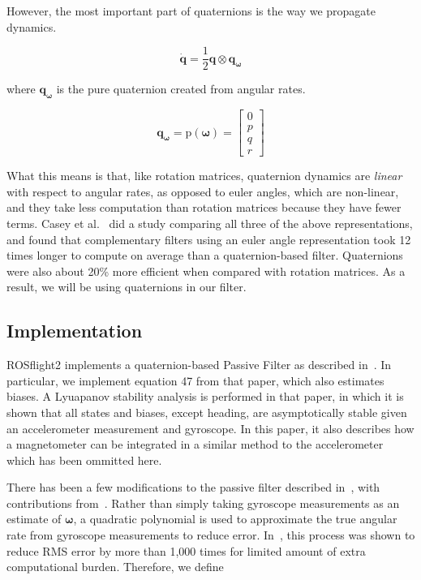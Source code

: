 \documentclass[paper=a4, fontsize=11pt]{scrartcl} %
\numberwithin{equation}{section} %
\numberwithin{figure}{section} %
\numberwithin{table}{section} %
\begin{document}
However, the most important part of quaternions is the way we propagate dynamics.

\begin{equation}
	\dot{\bm{q}} = \frac{1}{2} \bm{q} \otimes \bm{q_{\omega}}
\end{equation}

where $\bm{q_{\omega}}$ is the pure quaternion created from angular rates.

\begin{equation}
	\bm{q_{\omega}} = \textrm{p}(\bm{\omega}) =
			  \begin{bmatrix}
				0 \\
				p \\
				q \\
				r 
			 \end{bmatrix} 
\end{equation}

What this means is that, like rotation matrices, quaternion dynamics are \textit{linear} with respect to angular rates, as opposed to euler angles, which are non-linear, and they take less computation than rotation matrices because they have fewer terms.  Casey et al.~\cite{Casey2013} did a study comparing all three of the above representations, and found that complementary filters using an euler angle representation took 12 times longer to compute on average than a quaternion-based filter.  Quaternions were also about 20\% more efficient when compared with rotation matrices.  As a result, we will be using quaternions in our filter.

\subsection{Implementation}

ROSflight2 implements a quaternion-based Passive Filter as described in~\cite{Mahony2007}.  In particular, we implement equation 47 from that paper, which also estimates biases.  A Lyuapanov stability analysis is performed in that paper, in which it is shown that all states and biases, except heading, are asymptotically stable given an accelerometer measurement and gyroscope.  In this paper, it also describes how a magnetometer can be integrated in a similar method to the accelerometer which has been ommitted here.

There has been a few modifications to the passive filter described in~\cite{Mahony2007}, with contributions from~\cite{Casey2013}.  Rather than simply taking gyroscope measurements as an estimate of $\bm{\omega}$, a quadratic polynomial is used to approximate the true angular rate from gyroscope measurements to reduce error.  In~\cite{Casey2013}, this process was shown to reduce RMS error by more than 1,000 times for limited amount of extra computational burden.  Therefore, we define
\end{document}
